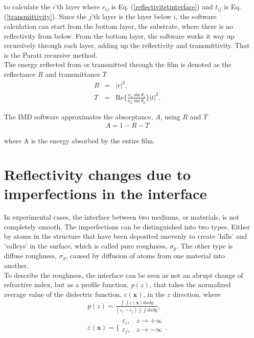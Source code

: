 to calculate the $i$'th layer where $r_{ij}$ is Eq. (\ref{reflectivitetinterface}) and $t_{ij}$ is Eq. (\ref{transmittivity}). Since the $j$'th layer is the layer below $i$, the software calculation can start from the bottom layer, the substrate, where there is no reflectivity from below. From the bottom layer, the software works it way up recursively through each layer, adding up the reflectivity and transmittivity. That is the Paratt recursive method\cite{Parratt:1954p5110}.\\
The energy reflected from or transmitted through the film is denoted as the reflectance $R$ and transmittance $T$
\begin{eqnarray}
	R &=& |r|^2,\\
	T &=& \mathrm{Re}\Bigg\{\frac{n_s \sin{\theta_s}}{n_a \sin{\theta_a}}\Bigg\}|t|^2.
\end{eqnarray}

The IMD software approximates the absorptance, $A$, using $R$ and $T$
\begin{eqnarray}
	A = 1-R-T
\end{eqnarray}

where A is the energy absorbed by the entire film.

\section{Reflectivity changes due to imperfections in the interface}
In experimental cases, the interface between two mediums, or materials, is not completely smooth. The imperfections can be distinguished into two types. Either by atoms in the structure that have been deposited unevenly to create 'hills' and 'valleys' in the surface, which is called pure roughness, $\sigma_p$. The other type is diffuse roughness, $\sigma_d$, caused by diffusion of atoms from one material into another.\\
To describe the roughness, the interface can be seen as not an abrupt change of refractive index, but as a profile function, $p(z)$\cite{Stearns:1989p5096}, that takes the normalized average value of the dielectric function, $\varepsilon(\mathbf{x})$, in the $z$ direction, where
\begin{eqnarray}
	p(z) = \frac{\int \int \varepsilon(\mathbf{x})dxdy}{(\varepsilon_i-\varepsilon_j)\int \int dxdy}, \\
	\varepsilon(\mathbf{x}) = \Bigg\{
	\begin{array}{rl}
		\varepsilon_i, & z \rightarrow + \infty \\
		\varepsilon_j, & z \rightarrow - \infty \\
	\end{array}.
\end{eqnarray}

